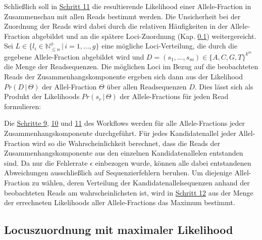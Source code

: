 Schließlich soll in \hyperref[step11]{Schritt 11\label{step11txt}} die resultierende Likelihood einer Allele-Fraction in Zusammenschau mit allen Reads bestimmt werden. Die Unsicherheit bei der Zuordnung der Reads wird dabei durch die relativen Häufigkeiten in der Allele-Fraction abgebildet und an die spätere Loci-Zuordnung (Kap. \ref{subsec:sol_loci_lh}) weitergereicht. Sei $L \in \{l_{i} \in \mathds{N}_{\leq n}^\phi \, | \, i=1, \dots, g\}$ eine mögliche Loci-Verteilung, die durch die gegebene Allele-Fraction abgebildet wird und $D = (s_{1}, \dots, s_{m}) \in \{A,C, G, T\}^{k^m}$ die Menge der Readsequenzen. Die möglichen Loci im Bezug auf die beobachteten Reads der Zusammenhangskomponente ergeben sich dann aus der Likelihood $Pr(D \, | \, \Theta)$ der Allel-Fraction $\Theta$ über allen Readsequenzen $D$. Dies lässt sich als Produkt der Likelihoods $Pr(s_{r} \, | \, \Theta)$ der Allele-Fractions für jeden Read formulieren: 
\vspace{-0.5cm}
\begin{center}
\end{center}

Die \hyperref[step9]{Schritte 9}, \hyperref[step10]{10} und \hyperref[step11]{11} des Workflows werden für alle Allele-Fractions jeder Zusammenhangskomponente durchgeführt. Für jedes Kandidatenallel jeder Allel-Fraction wird so die Wahrscheinlichkeit berechnet, dass die Reads der Zusammenhangskomponente aus den einzelnen Kandidatenallelen entstanden sind. Da nur die Fehlerrate $\epsilon$ einbezogen wurde, können alle dabei entstandenen Abweichungen ausschließlich auf Sequenzierfehlern beruhen. Um diejenige Allel-Fraction zu wählen, deren Verteilung der Kandidatenallelsequenzen anhand der beobachteten Reads am wahrscheinlichsten ist, wird in \hyperref[step12]{Schritt 12\label{step12txt}} aus der Menge der errechneten Likelihoods aller Allele-Fractions das Maximum bestimmt.  

\subsection{Locuszuordnung mit maximaler Likelihood} \label{subsec:sol_loci_lh}

